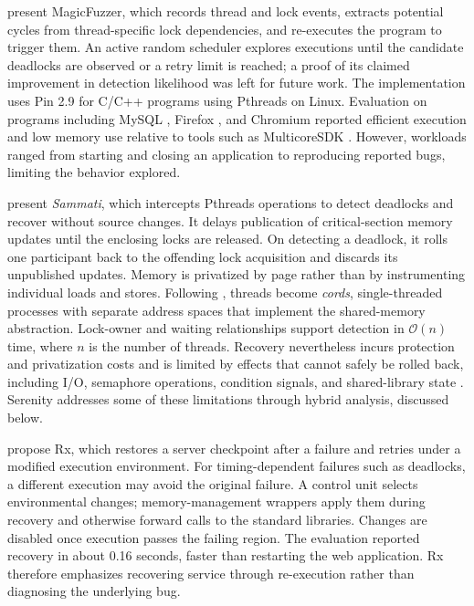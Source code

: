 \citet{magicfuzzer} present MagicFuzzer, which records thread and lock events, extracts potential cycles from thread-specific lock dependencies, and re-executes the program to trigger them.
An active random scheduler explores executions until the candidate deadlocks are observed or a retry limit is reached; a proof of its claimed improvement in detection likelihood was left for future work.
The implementation uses Pin 2.9 \citep{pin} for C/C++ programs using Pthreads on Linux.
Evaluation on programs including MySQL \citep{mysql}, Firefox \citep{firefox}, and Chromium \citep{chromium} reported efficient execution and low memory use relative to tools such as MulticoreSDK \citep{mcsdk}.
However, workloads ranged from starting and closing an application to reproducing reported bugs, limiting the behavior explored.

\citet{sammati} present \emph{Sammati}, which intercepts Pthreads operations to detect deadlocks and recover without source changes.
It delays publication of critical-section memory updates until the enclosing locks are released. On detecting a deadlock, it rolls one participant back to the offending lock acquisition and discards its unpublished updates.
Memory is privatized by page rather than by instrumenting individual loads and stores. Following \citet{berger}, threads become \emph{cords}, single-threaded processes with separate address spaces that implement the shared-memory abstraction.
Lock-owner and waiting relationships support detection in $\mathcal{O}(n)$ time, where $n$ is the number of threads.
Recovery nevertheless incurs protection and privatization costs and is limited by effects that cannot safely be rolled back, including I/O, semaphore operations, condition signals, and shared-library state \citep{pyla}.
Serenity addresses some of these limitations through hybrid analysis, discussed below.

\citet{rx} propose Rx, which restores a server checkpoint after a failure and retries under a modified execution environment.
For timing-dependent failures such as deadlocks, a different execution may avoid the original failure.
A control unit selects environmental changes; memory-management wrappers apply them during recovery and otherwise forward calls to the standard libraries.
Changes are disabled once execution passes the failing region. The evaluation reported recovery in about 0.16 seconds, faster than restarting the web application.
Rx therefore emphasizes recovering service through re-execution rather than diagnosing the underlying bug.

